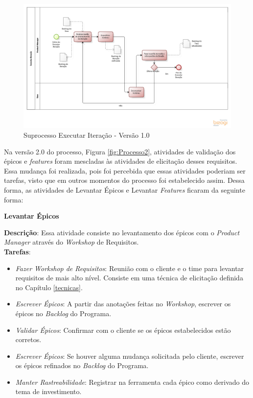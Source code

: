 \begin{figure}[!htb]
\includegraphics[scale=0.5]{figuras/iteracao1.png}
\caption{Suprocesso Executar Iteração - Versão 1.0}
\label{fig:iteracao1}
\end{figure}

\pagebreak
Na versão 2.0 do processo, Figura \ref{fig:Processo2}, atividades de validação dos épicos e \textit{features} foram mescladas às atividades de elicitação desses requisitos.
Essa mudança foi realizada, pois foi percebida que essas atividades poderiam ser tarefas, visto que em outros momentos do processo foi estabelecido assim.
Dessa forma, as atividades de Levantar Épicos e Levantar \textit{Features} ficaram da seguinte forma:

\textbf{Levantar Épicos}

  \textbf{Descrição}: Essa atividade consiste no levantamento dos épicos com o \textit{Product Manager} através do  \textit{Workshop} de Requisitos. \\

  \textbf{Tarefas}:

  \begin{itemize}
   \item \indent \textit{Fazer Workshop de Requisitos}: Reunião com o cliente e o time para levantar requisitos de mais alto nível. Consiste
   em uma técnica de elicitação definida no Capítulo \ref{tecnicas}.

   \item \indent \textit{Escrever Épicos}: A partir das anotações feitas no \textit{Workshop},
   escrever os épicos no \textit{Backlog} do Programa.
   
   \item \indent \textit{Validar Épicos}: Confirmar com o cliente se os épicos estabelecidos estão corretos.

   \item \indent \textit{Escrever Épicos}: Se houver alguma mudança solicitada pelo cliente, escrever os épicos
   refinados no \textit{Backlog} do Programa.
   
   \item \indent \textit{Manter Rastreabilidade}: Registrar na ferramenta cada épico como derivado do tema de investimento.

  \end{itemize}

